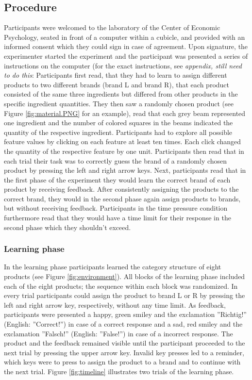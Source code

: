 \documentclass[a4paper,man,natbib]{apa6}
\begin{document}
\subsection{Procedure}
Participants were welcomed to the laboratory of the Center of Economic Psychology, seated in front of a computer within a cubicle, and provided with an informed consent which they could sign in case of agreement. Upon signature, the experimenter started the experiment and the participant was presented a series of instructions on the computer (for the exact instructions, see \textit{appendix, still need to do this}: Participants first read, that they had to learn to assign different products to two different brands (brand L and brand R), that each product consisted of the same three ingredients but differed from other products in the specific ingredient quantities. They then saw a randomly chosen product (see Figure \ref{fig:material.PNG} for an example), read that each grey beam represented one ingredient and the number of colored squares in the beams indicated the quantity of the respective ingredient. Participants had to explore all possible feature values by clicking on each feature at least ten times. Each click changed the quantity of the respective feature by one unit. Participants then read that in each trial their task was to correctly guess the brand of a randomly chosen product by pressing the left and right arrow keys. Next, participants read that in the first phase of the experiment they would learn the correct brand of each product by receiving feedback. After consistently assigning the products to the correct brand, they would in the second phase again assign products to brands, but without receiving feedback. Participants in the time pressure condition furthermore read that they would have a time limit for their response in the second phase which they shouldn't exceed.

\subsubsection{Learning phase}
In the learning phase participants learned the category structure of eight products (see Figure \ref{fig:environment}). All blocks of the learning phase included each of the eight products; the sequence within each block was randomized. In every trial participants could assign the product to brand L or R by pressing the left and right arrow key, respectively, without any time limit. As feedback, participants were presented a happy, green smiley and the exclamation ''Richtig!'' (English: ''Correct!'') in case of a correct response and a sad, red smiley and the exclamation ''Falsch!'' (English: ''False!'') in case of a incorrect response. The product and the feedback remained visible until the participant proceeded to the next trial by pressing the upper arrow key. 
Invalid key presses led to a reminder, which keys were to press to assign the product to a brand and to continue with the next trial. 
Figure \ref{fig:timeline} illustrates two trials of the learning phase.
\end{document}
